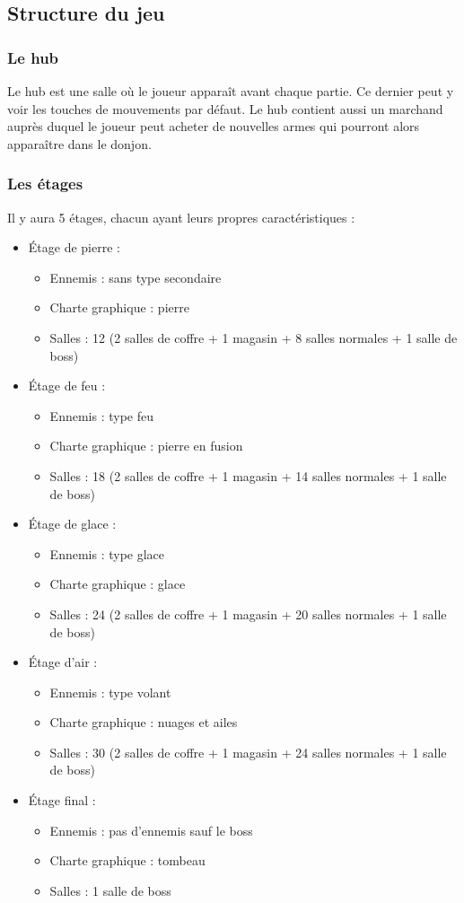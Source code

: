 \documentclass[]{extarticle}
\begin{document}
	\subsection{Structure du jeu}
		\subsubsection{Le hub}
\bigbreak
\bigbreak
Le hub est une salle où le joueur apparaît avant chaque partie. Ce dernier peut y voir les touches de mouvements par défaut. Le hub contient aussi un marchand auprès duquel le joueur peut acheter de nouvelles armes qui pourront alors apparaître dans le donjon.
\bigbreak

		\subsubsection{Les étages}
\bigbreak
\bigbreak
Il y aura 5 étages, chacun ayant leurs propres caractéristiques :
\bigbreak
\begin{itemize}
\item Étage de pierre :
\begin{itemize}
\item Ennemis : sans type secondaire
\item Charte graphique : pierre
\item Salles : 12 (2 salles de coffre + 1 magasin + 8 salles normales + 1 salle de boss)
\end{itemize}
\bigbreak
\item Étage de feu :
\begin{itemize}
\item Ennemis : type feu
\item Charte graphique : pierre en fusion
\item Salles : 18 (2 salles de coffre + 1 magasin + 14 salles normales + 1 salle de boss)
\end{itemize}
\bigbreak
\item Étage de glace :
\begin{itemize}
\item Ennemis : type glace
\item Charte graphique : glace
\item Salles : 24 (2 salles de coffre + 1 magasin + 20 salles normales + 1 salle de boss)
\end{itemize}
\bigbreak
\item Étage d’air :
\begin{itemize}
\item Ennemis : type volant
\item Charte graphique : nuages et ailes
\item Salles : 30 (2 salles de coffre + 1 magasin + 24 salles normales + 1 salle de boss)
\end{itemize}
\bigbreak
\item Étage final :
\begin{itemize}
\item Ennemis : pas d’ennemis sauf le boss
\item Charte graphique : tombeau
\item Salles : 1 salle de boss
\end{itemize}
\end{itemize}
\end{document}
